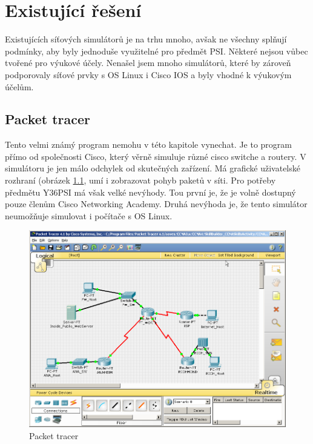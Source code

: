 \chapter{Existující řešení}

Existujících síťových simulátorů je na trhu mnoho, avšak ne všechny splňují podmínky, aby byly jednoduše využitelné pro předmět PSI. Některé nejsou vůbec tvořené pro výukové účely. Nenašel jsem mnoho simulátorů, které by zároveň podporovaly síťové prvky s OS Linux i Cisco IOS a byly vhodné k výukovým účelům.




\section{Packet tracer}

Tento velmi známý program nemohu v této kapitole vynechat. Je to program přímo od společnosti Cisco, který věrně simuluje různé cisco switche a routery. V simulátoru je jen málo odchylek od skutečných zařízení\cite{wiki:packetTracer}. Má grafické uživatelské rozhraní (obrázek \ref{obr_packet-tracer}, umí i zobrazovat pohyb paketů v síti. Pro potřeby předmětu Y36PSI má však velké nevýhody. Tou první je, že je volně dostupný pouze členům Cisco Networking Academy. Druhá nevýhoda je, že tento simulátor neumožňuje simulovat i počítače s OS Linux.

\begin{figure}[h]
\begin{center}
\includegraphics[width=12cm]{obrazky/packet-tracer}
\caption{Packet tracer}
\label{obr_packet-tracer}
\end{center}
\end{figure}




